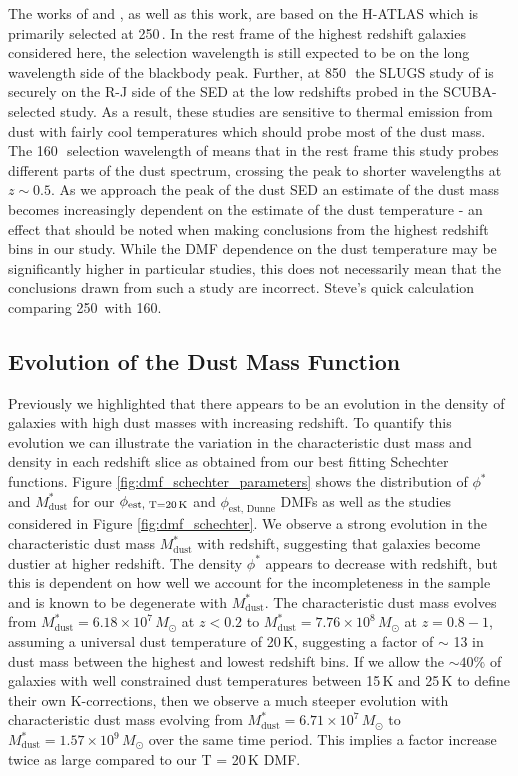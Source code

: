 The works of \citealt{Dunne_2011} and \citealt{Beeston_2018}, as well as this work, are based on the H-ATLAS which is primarily selected at 250\,\micron. In the rest frame of the highest redshift galaxies considered here, the selection wavelength is still expected to be on the long wavelength side of the blackbody peak. Further, at 850\,\micron\, the SLUGS study of \citealt{Vlahakis_2005} is securely on the R-J side of the SED at the low redshifts probed in the SCUBA-selected study. As a result, these studies are sensitive to thermal emission from dust with fairly cool temperatures which should probe most of the dust mass. The 160\,\micron\ selection wavelength of \citealt{Pozzi_2020} means that in the rest frame this study probes different parts of the dust spectrum, crossing the peak to shorter wavelengths at $z \sim 0.5$. As we approach the peak of the dust SED an estimate of the dust mass becomes increasingly dependent on the estimate of the dust temperature - an effect that should be noted when making conclusions from the highest redshift bins in our study. While the DMF dependence on the dust temperature may be significantly higher in particular studies, this does not necessarily mean that the conclusions drawn from such a study are incorrect. {\color{red}Steve's quick calculation comparing 250\micron\ with 160\micron.}

\subsection{Evolution of the Dust Mass Function}

Previously we highlighted that there appears to be an evolution in the density of galaxies with high dust masses with increasing redshift. To quantify this evolution we can illustrate the variation in the characteristic dust mass and density in each redshift slice as obtained from our best fitting Schechter functions. Figure \ref{fig:dmf_schechter_parameters} shows the distribution of $\phi^*$ and $M_{\textrm{dust}}^*$ for our $\phi_{\textrm{est, T=20\,K}}$ and $\phi_{\textrm{est, Dunne}}$ DMFs as well as the studies considered in Figure \ref{fig:dmf_schechter}. We observe a strong evolution in the characteristic dust mass $M_{\textrm{dust}}^*$ with redshift, suggesting that galaxies become dustier at higher redshift. The density $\phi^*$ appears to decrease with redshift, but this is dependent on how well we account for the incompleteness in the sample and is known to be degenerate with $M_{\textrm{dust}}^*$. The characteristic dust mass evolves from $M_{\textrm{dust}}^* = 6.18\times10^7\,M_{\odot}$ at $z < 0.2$ to $M_{\textrm{dust}}^* = 7.76\times10^8\,M_{\odot}$ at $z = 0.8 - 1$, assuming a universal dust temperature of 20\,K, suggesting a factor of $\sim$ 13 in dust mass between the highest and lowest redshift bins. If we allow the $\sim 40\%$ of galaxies with well constrained dust temperatures between 15\,K and 25\,K to define their own K-corrections, then we observe a much steeper evolution with characteristic dust mass evolving from $M_{\textrm{dust}}^* = 6.71\times10^7\,M_{\odot}$ to $M_{\textrm{dust}}^* = 1.57\times10^9\,M_{\odot}$ over the same time period. This implies a factor increase twice as large compared to our T = 20\,K DMF.

